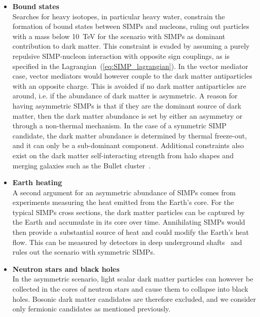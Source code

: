 \begin{itemize}
 \item[] \textbf{Bound states}\\
Searches for heavy isotopes, in particular heavy water, constrain the formation of bound states between \acp{SIMP} and nucleons, ruling out particles with a mass below 10~TeV for the scenario with \acp{SIMP} as dominant contribution to dark matter. This constraint is evaded by assuming a purely repulsive \ac{SIMP}-nucleon interaction with opposite sign couplings, as is specified in the Lagrangian~(\ref{eq:SIMP_lagrangian}). In the vector mediator case, vector mediators would however couple to the dark matter antiparticles with an opposite charge. This is avoided if no dark matter antiparticles are around, i.e. if the abundance of dark matter is asymmetric. A reason for having asymmetric \acp{SIMP} is that if they are the dominant source of dark matter, then the dark matter abundance is set by either an asymmetry or through a non-thermal mechanism. In the case of a symmetric \ac{SIMP} candidate, the dark matter abundance is determined by thermal freeze-out, and it can only be a sub-dominant component. Additional constraints also exist on the dark matter self-interacting strength from halo shapes and merging galaxies such as the Bullet cluster~\cite{Randall:2007ph, Feng:2010gw}.

\item[] \textbf{Earth heating}\\
A second argument for an asymmetric abundance of \acp{SIMP} comes from experiments measuring the heat emitted from the Earth's core. For the typical \acp{SIMP} cross sections, the dark matter particles can be captured by the Earth and accumulate in its core over time. Annihilating \acp{SIMP} would then provide a substantial source of heat and could modify the Earth's heat flow. This can be measured by detectors in deep underground shafts~\cite{Mack:2007xj} and rules out the scenario with symmetric \acp{SIMP}.

\item[] \textbf{Neutron stars and black holes}\\
In the asymmetric scenario, light scalar dark matter particles can however be collected in the cores of neutron stars and cause them to collapse into black holes. Bosonic dark matter candidates are therefore excluded, and we consider only fermionic candidates as mentioned previously.


\end{itemize}
